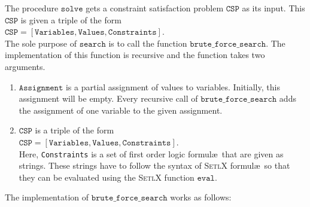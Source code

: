 The procedure $\texttt{solve}$ gets a constraint satisfaction problem $\texttt{CSP}$ as its input.  
This $\texttt{CSP}$ is given a triple of the form  
\\[0.2cm]
\hspace*{1.3cm}
$\texttt{CSP} = [\texttt{Variables}, \texttt{Values}, \texttt{Constraints}]$.
\\[0.2cm]
The sole purpose of $\texttt{search}$ is to call the function $\texttt{brute\_force\_search}$.  The
implementation of this function is recursive and the function takes two arguments.
\begin{enumerate}
\item $\texttt{Assignment}$ is a partial assignment of values to variables.  Initially, this assignment will be
      empty.  Every recursive call of $\texttt{brute\_force\_search}$ adds the assignment of one variable to
      the given assignment. 
\item $\texttt{CSP}$ is a triple of the form
      \\[0.2cm]
      \hspace*{1.3cm}
      $\texttt{CSP} = [\texttt{Variables}, \texttt{Values}, \texttt{Constraints}]$.
      \\[0.2cm]
      Here, \texttt{Constraints} is a set of first order logic formul\ae\ that are given as strings.  These
      strings have to follow the syntax of \textsc{SetlX} formul\ae\ so that they can be evaluated using the
      \textsc{SetlX} function $\texttt{eval}$.
\end{enumerate}
The implementation of $\texttt{brute\_force\_search}$ works as follows:
